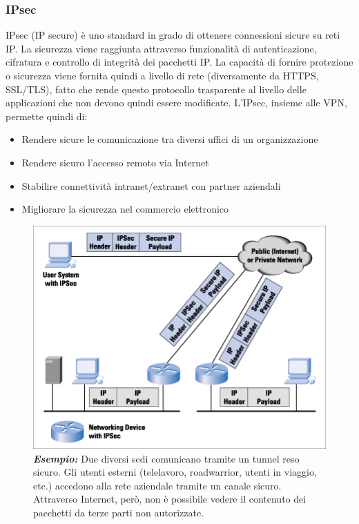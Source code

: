 \subsubsection{IPsec}
IPsec (IP secure) è uno standard in grado di ottenere connessioni sicure su reti IP. La sicurezza viene raggiunta attraverso funzionalità di autenticazione, cifratura e controllo di integrità dei pacchetti IP. La capacità di fornire protezione o sicurezza viene fornita quindi a livello di rete (diversamente da HTTPS, SSL/TLS), fatto che rende questo protocollo trasparente al livello delle applicazioni che non devono quindi essere modificate. L'IPsec, insieme alle VPN, permette quindi di:
\begin{itemize}
\item Rendere sicure le comunicazione tra diversi uffici di un organizzazione 
\item Rendere sicuro l'accesso remoto via Internet 
\item Stabilire connettività intranet/extranet con partner aziendali
\item Migliorare la sicurezza nel commercio elettronico
\end{itemize}

\begin{figure}[htbp]
	\centering
	\includegraphics[scale = 0.7]{images/VPN}
	\caption{\textit{\textbf{Esempio:}} Due diversi sedi comunicano tramite un tunnel reso sicuro. Gli utenti esterni (telelavoro, roadwarrior, utenti in viaggio, etc.) accedono alla rete aziendale tramite un canale sicuro. Attraverso Internet, però, non è possibile vedere il contenuto dei pacchetti da terze parti non autorizzate.}
	\label{img:vpn-ipsec}
\end{figure}


